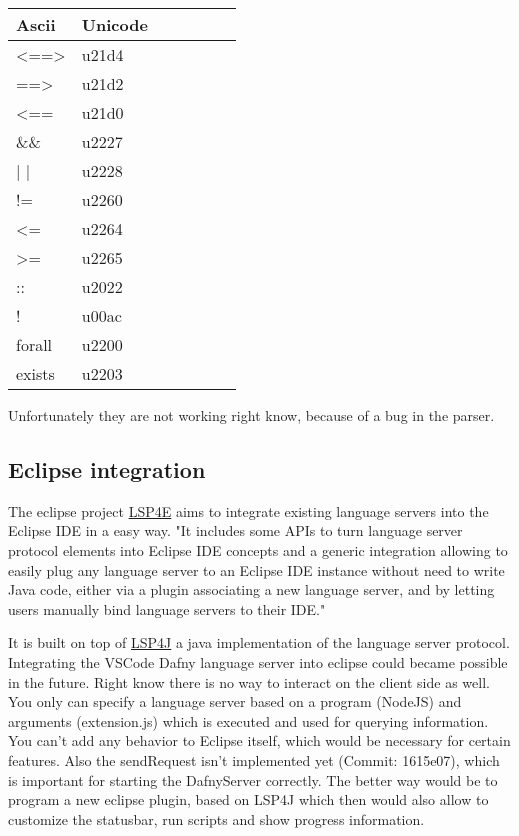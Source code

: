 \begin{longtable}[H]
	{l|p{}| p{} | p{} | p{} | p{} | p{}}
	
	\textbf{Ascii} & \textbf{Unicode}  \\ \hline
	<==> & u21d4  \\  
	==> & u21d2  \\  
	<== & u21d0  \\  
	\&\& & u2227  \\  
	| | & u2228  \\  
	!= & u2260  \\  
	<= & u2264  \\  
	>= & u2265  \\  
	:: & u2022  \\  
	! & u00ac  \\  
	forall & u2200  \\  
	exists & u2203  
	
	
\end{longtable}

Unfortunately they are not working right know, because of a bug in the parser.


\subsection{Eclipse integration}
The eclipse project \href{https://projects.eclipse.org/projects/technology.lsp4e}{LSP4E} aims to integrate existing language servers into the Eclipse IDE in a easy way. 
\newline
"It includes some APIs to turn language server protocol elements into Eclipse IDE concepts and a generic integration allowing to easily plug any language server to an Eclipse IDE instance without need to write Java code, either via a plugin associating a new language server, and by letting users manually bind language servers to their IDE." \cite{lsp4e}

It is built on top of \href{https://github.com/eclipse/lsp4j}{LSP4J} a java implementation of the language server protocol. 
\newline
Integrating the VSCode Dafny language server into eclipse could became possible in the future. Right know there is no way to interact on the client side as well. You only can specify a language server based on a program (NodeJS) and arguments (extension.js) which is executed and used for querying information. You can't add any behavior to Eclipse itself, which would be necessary for certain features. Also the sendRequest isn't implemented yet (Commit: 1615e07), which is important for starting the DafnyServer correctly. 
The better way would be to program a new eclipse plugin, based on LSP4J which then would also allow to customize the statusbar, run scripts and show progress information. 




